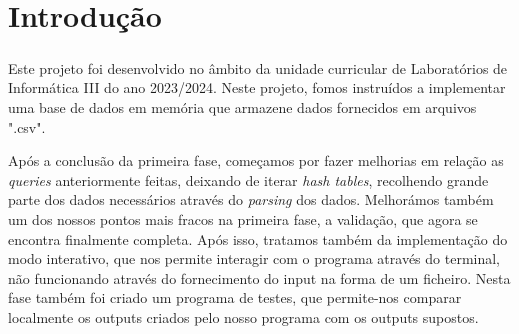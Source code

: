\documentclass[12pt,a4paper]{report}
\begin{document}
\newpage

    \chapter{Introdução}
        
        \paragraph{} Este projeto foi desenvolvido no âmbito da unidade curricular de Laboratórios de Informática III do ano 2023/2024. Neste projeto, fomos instruídos a implementar uma base de dados em memória que armazene dados fornecidos em arquivos ".csv".
        \par Após a conclusão da primeira fase, começamos por fazer melhorias em relação as \textit{queries} anteriormente feitas, deixando de iterar \textit{hash tables}, recolhendo grande parte dos dados necessários através do \textit{parsing} dos dados. Melhorámos também um dos nossos pontos mais fracos na primeira fase, a validação, que agora se encontra finalmente completa.
        Após isso, tratamos também da implementação do modo interativo, que nos permite interagir com o programa através do terminal, não funcionando através do fornecimento do input na forma de um ficheiro.
        Nesta fase também foi criado um programa de testes, que permite-nos comparar localmente os outputs criados pelo nosso programa com os outputs supostos.
        
\end{document}
